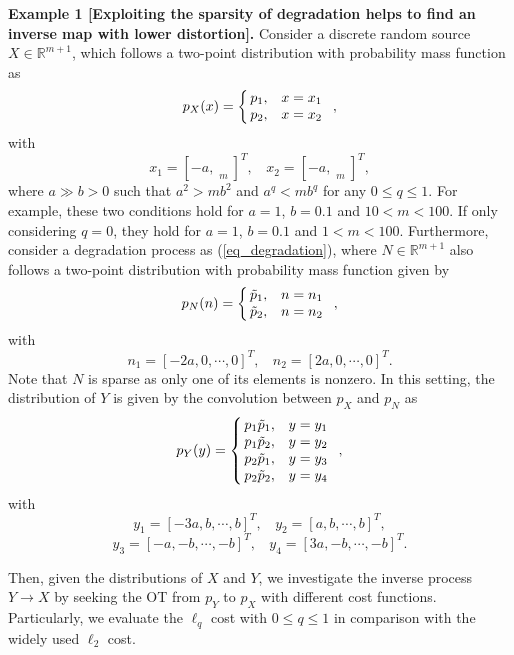 \documentclass[10pt,journal,compsoc]{IEEEtran}
\begin{document}
\textbf{Example 1 [Exploiting the sparsity of degradation helps to
find an inverse map with lower distortion].}
Consider a discrete random source $X\in \mathbb{R}^{m+1}$,
which follows a two-point distribution with probability mass function as
\begin{equation}\notag
p_X(x) = \left\{\! {\begin{array}{*{20}{l}}
\!{p_1,}&{x=x_1}\\
\!{p_2,}&{x=x_2}
\end{array}} \right.,
\end{equation}
with
\[x_1=[-a,\mathop{\underbrace{b,\cdots,b}}\limits_{m}]^T,~~~~x_2=[-a,\mathop{\underbrace{-b,\cdots,-b}}\limits_{m}]^T,\]
where $a\gg b>0$ such that $a^2>mb^2$ and $a^q<mb^q$ for any $0\leq q\leq 1$.
For example, these two conditions hold for $a=1$, $b=0.1$ and $10<m<100$.
If only considering $q=0$, they hold for $a=1$, $b=0.1$ and $1<m<100$.
Furthermore, consider a degradation process as (\ref{eq_degradation}),
where $N\in \mathbb{R}^{m+1}$ also follows a two-point distribution
with probability mass function given by
\begin{equation}\notag
p_N(n) = \left\{\! {\begin{array}{*{20}{l}}
\!{\tilde{p}_1,}&{n=n_1}\\
\!{\tilde{p}_2,}&{n=n_2}
\end{array}} \right.,
\end{equation}
with
\[n_1=[-2a,0,\cdots,0]^T,~~~~n_2=[2a,0,\cdots,0]^T.\]
Note that $N$ is sparse as only one of its elements is nonzero.
In this setting, the distribution of $Y$ is given by the convolution
between $p_X$ and $p_N$ as
\begin{equation}\notag
p_Y(y) = \left\{\! {\begin{array}{*{20}{l}}
\!{p_1\tilde{p}_1,}&{y=y_1}\\
\!{p_1\tilde{p}_2,}&{y=y_2}\\
\!{p_2\tilde{p}_1,}&{y=y_3}\\
\!{p_2\tilde{p}_2,}&{y=y_4}
\end{array}} \right.,
\end{equation}
with
\[y_1=[-3a,b,\cdots,b]^T,~~~~y_2=[a,b,\cdots,b]^T,\]
\[y_3=[-a,-b,\cdots,-b]^T,~~~~y_4=[3a,-b,\cdots,-b]^T.\]

Then, given the distributions of $X$ and $Y$, we investigate
the inverse process $Y\rightarrow X$ by seeking the OT
from $p_Y$ to $p_X$ with different cost functions.
Particularly, we evaluate the $\ell_q$ cost with $0\leq q \leq 1$
in comparison with the widely used $\ell_2$ cost.
\end{document}
